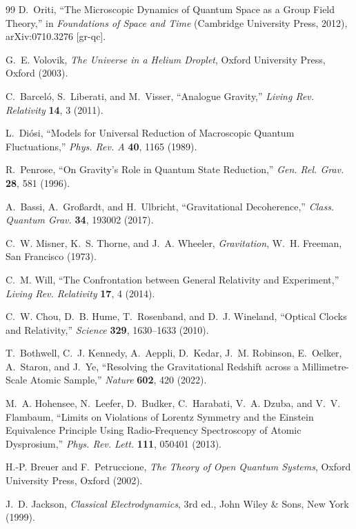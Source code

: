 \documentclass[pdflatex,sn-mathphys-num]{sn-jnl}%
\theoremstyle{thmstyleone}%
\theoremstyle{thmstyletwo}%
\theoremstyle{thmstylethree}%
\begin{document}
\begin{thebibliography}{99}
D.~Oriti,
``The Microscopic Dynamics of Quantum Space as a Group Field Theory,''
in \textit{Foundations of Space and Time}
(Cambridge University Press, 2012),
arXiv:0710.3276 [gr-qc].

G.~E. Volovik,
\textit{The Universe in a Helium Droplet},
Oxford University Press, Oxford (2003).

C.~Barcel\'o, S.~Liberati, and M.~Visser,
``Analogue Gravity,''
\textit{Living Rev. Relativity} \textbf{14}, 3 (2011).

L.~Di\'osi,
``Models for Universal Reduction of Macroscopic Quantum
Fluctuations,''
\textit{Phys. Rev. A} \textbf{40}, 1165 (1989).

R.~Penrose,
``On Gravity's Role in Quantum State Reduction,''
\textit{Gen. Rel. Grav.} \textbf{28}, 581 (1996).

A.~Bassi, A.~Gro{\ss}ardt, and H.~Ulbricht,
``Gravitational Decoherence,''
\textit{Class. Quantum Grav.} \textbf{34}, 193002 (2017).

C.~W. Misner, K.~S. Thorne, and J.~A. Wheeler,
\textit{Gravitation},
W.~H. Freeman, San Francisco (1973).

C.~M. Will,
``The Confrontation between General Relativity and
Experiment,''
\textit{Living Rev. Relativity} \textbf{17}, 4 (2014).

C.~W. Chou, D.~B. Hume, T.~Rosenband, and D.~J. Wineland,
``Optical Clocks and Relativity,''
\textit{Science} \textbf{329}, 1630--1633 (2010).

T.~Bothwell, C.~J. Kennedy, A.~Aeppli, D.~Kedar, J.~M.
Robinson, E.~Oelker, A.~Staron, and J.~Ye,
``Resolving the Gravitational Redshift across a
Millimetre-Scale Atomic Sample,''
\textit{Nature} \textbf{602}, 420 (2022).

M.~A. Hohensee, N.~Leefer, D.~Budker, C.~Harabati, V.~A.
Dzuba, and V.~V. Flambaum,
``Limits on Violations of Lorentz Symmetry and the Einstein
Equivalence Principle Using Radio-Frequency Spectroscopy of
Atomic Dysprosium,''
\textit{Phys. Rev. Lett.} \textbf{111}, 050401 (2013).

H.-P. Breuer and F.~Petruccione,
\textit{The Theory of Open Quantum Systems},
Oxford University Press, Oxford (2002).

J.~D. Jackson,
\textit{Classical Electrodynamics}, 3rd ed.,
John Wiley \& Sons, New York (1999).


\end{thebibliography}
\end{document}
